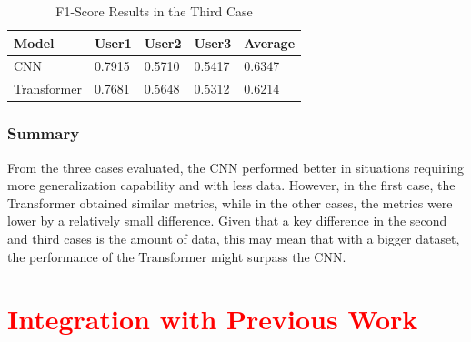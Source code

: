 \begin{table}[H]
    \centering
    \caption{F1-Score Results in the Third Case}
    \label{table:results_third_case_f1_score}
    \begin{tabular}{|l|l|l|l|l|}
        \hline
        Model & User1 & User2 & User3 & Average \\
        \hline
        CNN & 0.7915 & 0.5710 & 0.5417 & 0.6347 \\
        \hline
        Transformer & 0.7681 & 0.5648 & 0.5312 & 0.6214 \\
        \hline
    \end{tabular}
\end{table}

\subsubsection{Summary}

From the three cases evaluated, the CNN performed better in situations requiring more generalization capability and with less data. However, in the first case, the Transformer obtained similar metrics, while in the other cases, the metrics were lower by a relatively small difference. Given that a key difference in the second and third cases is the amount of data, this may mean that with a bigger dataset, the performance of the Transformer might surpass the CNN.

\section{\textcolor{red}{Integration with Previous Work}}
